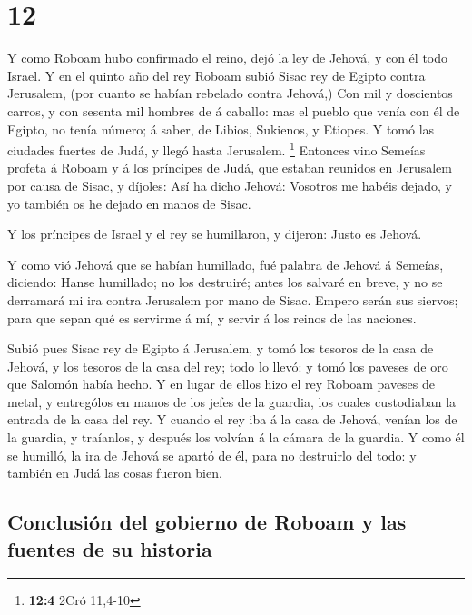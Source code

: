 \hypertarget{section-11}{%
\section{12}\label{section-11}}

 Y como Roboam hubo confirmado el reino, dejó la ley de
Jehová, y con él todo Israel.  Y en el quinto año del rey
Roboam subió Sisac rey de Egipto contra Jerusalem, (por cuanto se habían
rebelado contra Jehová,)  Con mil y doscientos carros, y
con sesenta mil hombres de á caballo: mas el pueblo que venía con él de
Egipto, no tenía número; á saber, de Libios, Sukienos, y Etiopes.
 Y tomó las ciudades fuertes de Judá, y llegó hasta
Jerusalem. \footnote{\textbf{12:4} 2Cró 11,4-10}  Entonces
vino Semeías profeta á Roboam y á los príncipes de Judá, que estaban
reunidos en Jerusalem por causa de Sisac, y díjoles: Así ha dicho
Jehová: Vosotros me habéis dejado, y yo también os he dejado en manos de
Sisac.

 Y los príncipes de Israel y el rey se humillaron, y
dijeron: Justo es Jehová.

 Y como vió Jehová que se habían humillado, fué palabra de
Jehová á Semeías, diciendo: Hanse humillado; no los destruiré; antes los
salvaré en breve, y no se derramará mi ira contra Jerusalem por mano de
Sisac.  Empero serán sus siervos; para que sepan qué es
servirme á mí, y servir á los reinos de las naciones.

 Subió pues Sisac rey de Egipto á Jerusalem, y tomó los
tesoros de la casa de Jehová, y los tesoros de la casa del rey; todo lo
llevó: y tomó los paveses de oro que Salomón había hecho.
 Y en lugar de ellos hizo el rey Roboam paveses de metal,
y entrególos en manos de los jefes de la guardia, los cuales custodiaban
la entrada de la casa del rey.  Y cuando el rey iba á la
casa de Jehová, venían los de la guardia, y traíanlos, y después los
volvían á la cámara de la guardia.  Y como él se humilló,
la ira de Jehová se apartó de él, para no destruirlo del todo: y también
en Judá las cosas fueron bien.

\hypertarget{conclusiuxf3n-del-gobierno-de-roboam-y-las-fuentes-de-su-historia}{%
\subsection{Conclusión del gobierno de Roboam y las fuentes de su
historia}\label{conclusiuxf3n-del-gobierno-de-roboam-y-las-fuentes-de-su-historia}}

